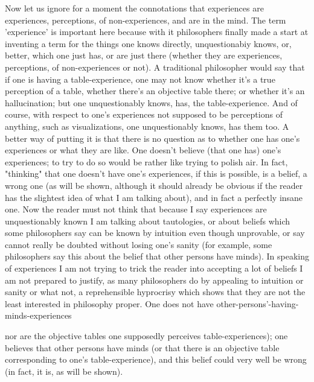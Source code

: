 \documentclass[10pt,twoside]{memoir}
\begin{document}
\begin{enumerate}
Now let us ignore for a moment the connotations that experiences are 
experiences, perceptions, of non-experiences, and are in the mind. The term 
'experience' is important here because with it philosophers finally made a 
start at inventing a term for the things one knows directly, unquestionabiy 
knows, or, better, which one just has, or are just there (whether they are 
experiences, perceptions, of non-experiences or not). A traditional 
philosopher would say that if one is having a table-experience, one may not 
know whether it's a true perception of a table, whether there's an objective 
table there; or whether it's an hallucination; but one unquestionably knows, 
has, the table-experience. And of course, with respect to one's experiences 
not supposed to be perceptions of anything, such as visualizations, one 
unquestionably knows, has them too. A better way of putting it is that there 
is no question as to whether one has one's experiences or what they are like. 
One doesn't believe (that one has) one's experiences; to try to do so would 
be rather like trying to polish air. In fact, "thinking" that one doesn't have 
one's experiences, if this is possible, is a belief, a wrong one (as will be 
shown, although it should already be obvious if the reader has the slightest 
idea of what I am talking about), and in fact a perfectly insane one. Now the 
reader must not think that because I say experiences are unquestionably 
known I am talking about tautologies, or about beliefs which some 
philosophers say can be known by intuition even though unprovable, or say 
cannot really be doubted without losing one's sanity (for example, some 
philosophers say this about the belief that other persons have minds). In 
speaking of experiences I am not trying to trick the reader into accepting a 
lot of beliefs I am not prepared to justify, as many philosophers do by 
appealing to intuition or sanity or what not, a reprehensible hyprocrisy 
which shows that they are not the least interested in philosophy proper. One 
does not have other-persons'-having-minds-experiences {nor are the objective 
tables one supposedly perceives table-experiences); one believes that other 
persons have minds (or that there is an objective table corresponding to one's 
table-experience), and this belief could very well be wrong (in fact, it is, as 
will be shown). 

}
\end{enumerate}
\end{document}

